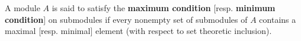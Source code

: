 A module \(A\) is said to satisfy the \textbf{maximum condition} [resp. \textbf{minimum condition}] on submodules if every nonempty set of submodules of \(A\) contains a maximal [resp. minimal] element (with respect to set theoretic inclusion).
